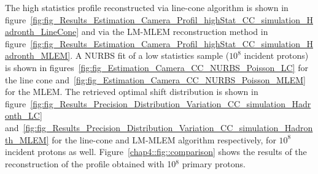 The high statistics profile reconstructed via line-cone algorithm is shown in figure~\ref{fig:fig_Results_Estimation_Camera_Profil_highStat_CC_simulation_Hadronth_LineCone} and via the LM-MLEM reconstruction method in figure~\ref{fig:fig_Results_Estimation_Camera_Profil_highStat_CC_simulation_Hadronth_MLEM}. A NURBS fit of a low statistics sample ($10^8$ incident protons) is shown in figures~\ref{fig:fig_Estimation_Camera_CC_NURBS_Poisson_LC} for the line cone and~\ref{fig:fig_Estimation_Camera_CC_NURBS_Poisson_MLEM} for the MLEM.
The retrieved optimal shift distribution is shown in figure~\ref{fig:fig_Results_Precision_Distribution_Variation_CC_simulation_Hadronth_LC} and~\ref{fig:fig_Results_Precision_Distribution_Variation_CC_simulation_Hadronth_MLEM} for the line-cone and LM-MLEM algorithm respectively, for $10^8$ incident protons as well.
Figure~\ref{chap4::fig::comparison} shows the results of the reconstruction of the profile obtained with 10$^8$ primary protons.


